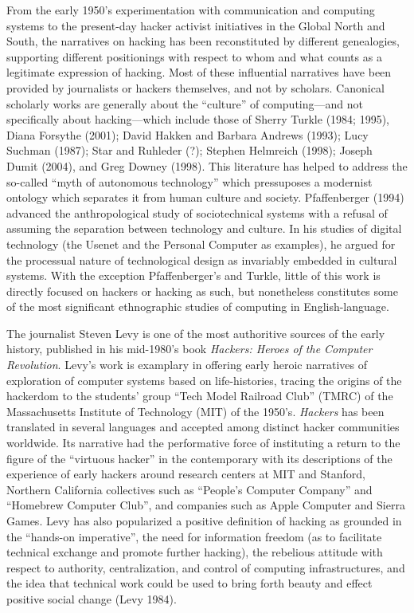 \documentclass[10pt,letter,oneside]{scrartcl}
\begin{document}
From the early 1950's experimentation with communication and computing systems
to the present-day hacker activist initiatives in the Global North and South,
the narratives on hacking has been reconstituted by different genealogies,
supporting different positionings with respect to whom and what counts as a
legitimate expression of hacking.  Most of these influential narratives have
been provided by journalists or hackers themselves, and not by scholars.
Canonical scholarly works are generally about the ``culture'' of
computing---and not specifically about hacking---which include those of Sherry
Turkle (1984; 1995), Diana Forsythe (2001); David Hakken and Barbara Andrews
(1993); Lucy Suchman (1987); Star and Ruhleder (?); Stephen Helmreich (1998);
Joseph Dumit (2004), and Greg Downey (1998). This literature has helped to
address the so-called ``myth of autonomous technology'' which pressuposes a
modernist ontology which separates it from human culture and society.
Pfaffenberger (1994) advanced the anthropological study of sociotechnical
systems with a refusal of assuming the separation between technology and
culture. In his studies of digital technology (the Usenet and the Personal
Computer as examples), he argued for the processual nature of technological
design as invariably embedded in cultural systems. With the exception
Pfaffenberger's and Turkle, little of this work is directly focused on hackers
or hacking as such, but nonetheless constitutes some of the most significant
ethnographic studies of computing in English-language.

The journalist Steven Levy is one of the most authoritive sources of the early
history, published in his mid-1980's book \emph{Hackers: Heroes of the Computer
Revolution}.  Levy's work is examplary in offering early heroic narratives of
exploration of computer systems based on life-histories, tracing the origins of
the hackerdom to the students' group ``Tech Model Railroad Club'' (TMRC) of the
Massachusetts Institute of Technology (MIT) of the 1950's. \emph{Hackers} has
been translated in several languages and accepted among distinct hacker
communities worldwide. Its narrative had the performative force of instituting
a return to the figure of the ``virtuous hacker'' in the contemporary with its
descriptions of the experience of early hackers around research centers at MIT
and Stanford, Northern California collectives such as ``People's Computer
Company'' and ``Homebrew Computer Club'', and companies such as Apple Computer
and Sierra Games. Levy has also popularized a positive definition of hacking as
grounded in the ``hands-on imperative'', the need for information freedom (as
to facilitate technical exchange and promote further hacking), the rebelious
attitude with respect to authority, centralization, and control of computing
infrastructures, and the idea that technical work could be used to bring forth
beauty and effect positive social change (Levy 1984).
\end{document}
